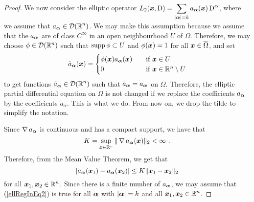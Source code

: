 \begin{proof}
 We now consider the elliptic operator
$\displaystyle L_2({\bm{x}},\operatorname{D})
= \sum_{|{\bm{\alpha}}|= k} a_{{\bm{\alpha}}}({\bm{x}}) \operatorname{D}^{{\bm{\alpha}}}$,
where we assume that $\displaystyle a_{{\bm{\alpha}}} \in \mathcal{D}(\mathbb{R}^n)$.
We may make this assumption because we assume that the $a_{{\bm{\alpha}}}$ are
of class $\displaystyle C^\infty$ in an open neighbourhood $U$ of
$\overline{\Omega}$.
Therefore, we may choose $\phi \in \mathcal{D}(\mathbb{R}^n)$ such that
$\operatorname{supp} \phi \subset U$ and $\phi({\bm{x}}) = 1$ for all
${\bm{x}} \in \overline{\Omega}$, and set
\[
\tilde{a}_{{\bm{\alpha}}}({\bm{x}})
= \begin{cases}
\phi({\bm{x}}) a_{{\bm{\alpha}}}({\bm{x}}) & \quad \text{if} \ {\bm{x}} \in U \\
0 & \quad \text{if} \ {\bm{x}} \in \mathbb{R}^n \setminus U
\end{cases}
\]
to get functions $\displaystyle \tilde{a}_{{\bm{\alpha}}} \in \mathcal{D}(\mathbb{R}^n)$
such that $\tilde{a}_{{\bm{\alpha}}} = a_{{\bm{\alpha}}}$ on $\Omega$.
Therefore, the elliptic partial differential equation on $\Omega$ is
not changed if we replace the coefficients $a_{{\bm{\alpha}}}$ by the
coefficients $\tilde{a}_\alpha$.
This is what we do.  From now on, we drop the tilde to simplify the notation.

Since $\operatorname{\nabla} a_{{\bm{\alpha}}}$ is continuous and has a compact support,
we have that
\[
K = \sup_{{\bm{x}} \in \mathbb{R}^n} \|\operatorname{\nabla} a_{{\bm{\alpha}}} ({\bm{x}}) \|_2 < \infty \ .
\]
Therefore, from the Mean Value Theorem, we get that
\begin{equation} \label{ellRegInEq2}
\left| a_{{\bm{\alpha}}}({\bm{x}}_1) - a_{{\bm{\alpha}}}({\bm{x}}_2) \right| \leq K
\|{\bm{x}}_1 - {\bm{x}}_2 \|_2
\end{equation}
for all $\displaystyle {\bm{x}}_1, {\bm{x}}_2 \in \mathbb{R}^n$.  Since there
is a finite number of $a_{{\bm{\alpha}}}$, we may assume that
(\ref{ellRegInEq2}) is true for all ${\bm{\alpha}}$ with $|{\bm{\alpha}}|=k$
and all $\displaystyle {\bm{x}}_1, {\bm{x}}_2 \in \mathbb{R}^n$.


\end{proof}
